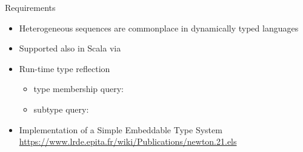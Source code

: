 \begin{frame}{Requirements}
  \begin{itemize}
  \item Heterogeneous sequences are commonplace in dynamically typed languages
  \item Supported also in Scala via 
  \item Run-time type reflection 
    \begin{itemize}
    \item type membership query:
    \item subtype query: 
    \end{itemize}
  \item Implementation of a Simple Embeddable Type System
    \url{https://www.lrde.epita.fr/wiki/Publications/newton.21.els}
  \end{itemize}
\end{frame}
